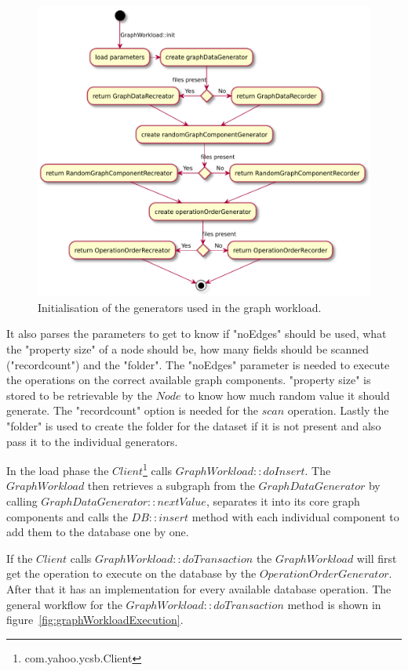 \begin{figure}[h!]
  \includegraphics[width=\textwidth]{images/extensions/GraphWorkload}
  \caption{Initialisation of the generators used in the graph workload.}
  \label{fig:graphWorkloadInit}
\end{figure}

It also parses the parameters to get to know if "noEdges" should be used,
what the "property size" of a node should be,
how many fields should be scanned ("recordcount") and the "folder".
The "noEdges" parameter is needed to execute the operations on the correct available graph components.
"property size" is stored to be retrievable by the $ Node $ to know how much random value it should generate.
The "recordcount" option is needed for the $ scan $ operation.
Lastly the "folder" is used to create the folder for the dataset if it is not present and also pass it to the individual generators.

In the load phase the $ Client $\footnote{com.yahoo.ycsb.Client} calls $ GraphWorkload::doInsert $.
The \linebreak
$ GraphWorkload $ then retrieves a subgraph from the $ GraphDataGenerator $ by calling $ GraphDataGenerator::nextValue $,
separates it into its core graph components and calls the $ DB::insert $ method with each individual component to add them to the database one by one.

If the $ Client $ calls $ GraphWorkload::doTransaction $ the $ GraphWorkload $ will first get the operation to execute on the database by the $ OperationOrderGenerator $.
After that it has an implementation for every available database operation.
The general workflow for the $ GraphWorkload::doTransaction $ method is shown in figure~\ref{fig:graphWorkloadExecution}.

